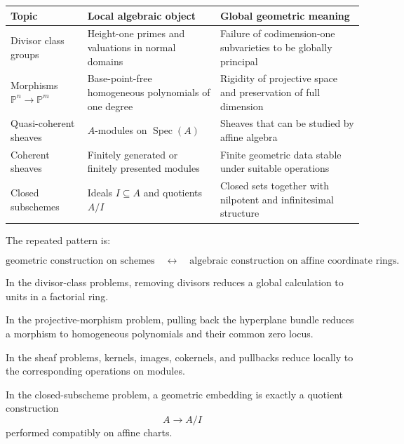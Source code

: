\documentclass[12pt,a4paper]{article}
\DeclareMathOperator{\Spec}{Spec}
\providecommand{\Spec}{\operatorname{Spec}}
\providecommand{\Pj}{\mathbb P}
\theoremstyle{notespace}
\begin{document}
\begin{center}
	\renewcommand{\arraystretch}{1.25}
	\begin{tabular}{
			>{\raggedright\arraybackslash}p{3.7cm}
			>{\raggedright\arraybackslash}p{5.1cm}
			>{\raggedright\arraybackslash}p{5.1cm}
		}
		\toprule
		\textbf{Topic}
		&
		\textbf{Local algebraic object}
		&
		\textbf{Global geometric meaning}
		\\
		\midrule
		
		Divisor class groups
		&
		Height-one primes and valuations in normal domains
		&
		Failure of codimension-one subvarieties to be globally principal
		\\[4pt]
		
		Morphisms \(\Pj^n\to\Pj^m\)
		&
		Base-point-free homogeneous polynomials of one degree
		&
		Rigidity of projective space and preservation of full dimension
		\\[4pt]
		
		Quasi-coherent sheaves
		&
		\(A\)-modules on \(\Spec(A)\)
		&
		Sheaves that can be studied by affine algebra
		\\[4pt]
		
		Coherent sheaves
		&
		Finitely generated or finitely presented modules
		&
		Finite geometric data stable under suitable operations
		\\[4pt]
		
		Closed subschemes
		&
		Ideals \(I\subseteq A\) and quotients \(A/I\)
		&
		Closed sets together with nilpotent and infinitesimal structure
		\\
		\bottomrule
	\end{tabular}
\end{center}

The repeated pattern is:

\[
\boxed{
	\text{geometric construction on schemes}
	\quad\longleftrightarrow\quad
	\text{algebraic construction on affine coordinate rings}.
}
\]

In the divisor-class problems, removing divisors reduces a global calculation to units in a factorial ring.

In the projective-morphism problem, pulling back the hyperplane bundle reduces a morphism to homogeneous polynomials and their common zero locus.

In the sheaf problems, kernels, images, cokernels, and pullbacks reduce locally to the corresponding operations on modules.

In the closed-subscheme problem, a geometric embedding is exactly a quotient construction
\[
A\longrightarrow A/I
\]
performed compatibly on affine charts.
\end{document}
